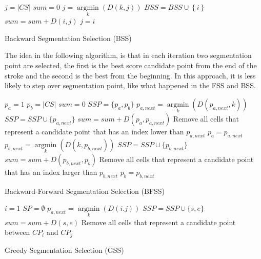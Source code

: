 \documentclass[journal,compsoc]{IEEEtran}
\begin{document}
\begin{algorithm}
$j={|CS|}$\;
$sum=0$\;
{
	$j = \mathop {\arg \min }\limits_k \left( {D\left( {k,j} \right)} \right)$\;
	$BSS = BSS \cup \left\{ i \right\}$\;
	$sum = sum + D\left( {i,j} \right)$\;
	$j=i$\;
}
\caption{Backward Segmentation Selection (BSS)}
\label{alg:bss}
\end{algorithm}

The idea in the following algorithm, is that in each iteration two segmentation point are selected, the first is the best score candidate point from the end of the stroke and the second is the best from the beginning. In this approach, it is less likely to step over segmentation point, like what happened in the FSS and BSS.

\begin{algorithm}
$p_{a}=1$\;
$p_{b}=|CS|$\;
$sum=0$\;
$SSP=\{p_{a},p_{b}\}$\;
{
	$p_{a,next} = \mathop {\arg \min}\limits_k (D(p_{a,next},k))$\;
	$SSP = SSP \cup \{p_{a,next}\}$\;
	$sum = sum + D(p_a,p_{a,next})$\;
	Remove all cells that represent a candidate point that has an index lower than $p_{a,next}$\;
	$p_{a}=p_{a,next}$\;
	$p_{b,next} = \mathop {\arg \min}\limits_k (D(k,p_{b,next}))$\;
	$SSP = SSP \cup \{p_{b,next}\}$\;
	$sum = sum + D(p_{b,next},p_b)$\;
	Remove all cells that represent a candidate point that has an index larger than  $p_{b,next}$\;
	$p_{b}=p_{b,next}$\;
}
\caption{Backward-Forward Segmentation Selection (BFSS)}
\label{alg:bfss}
\end{algorithm}


\begin{algorithm}
$i={1}$\;
$SP=\emptyset$\;
{
	$p_{a,next} = \mathop {\arg \min}\limits_k (D(i.j))$\;
	$SSP = SSP \cup \{s,e\}$\;
	$sum = sum + D(s,e)$\;
	Remove all cells that represent a candidate point between $CP_{i}$ and $CP_{j}$\;
}
\caption{Greedy Segmentation Selection (GSS)}
\label{alg:gss}
\end{algorithm}
\end{document}

